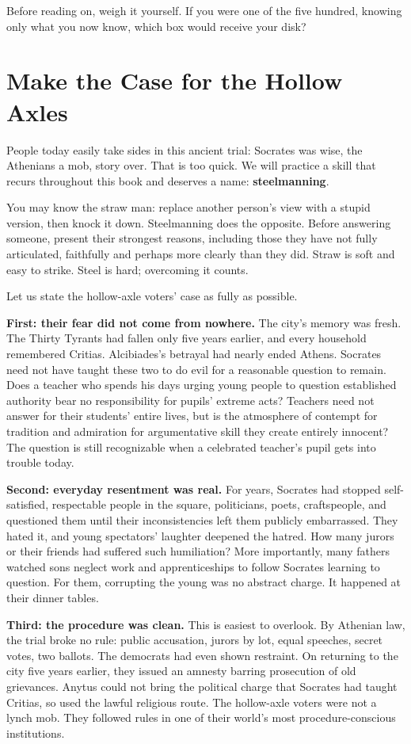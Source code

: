 Before reading on, weigh it yourself. If you were one of the five hundred, knowing only what you now know, which box would receive your disk?

\section{Make the Case for the Hollow Axles}
People today easily take sides in this ancient trial: Socrates was wise, the Athenians a mob, story over. That is too quick. We will practice a skill that recurs throughout this book and deserves a name: \textbf{steelmanning}.

You may know the straw man: replace another person's view with a stupid version, then knock it down. Steelmanning does the opposite. Before answering someone, present their strongest reasons, including those they have not fully articulated, faithfully and perhaps more clearly than they did. Straw is soft and easy to strike. Steel is hard; overcoming it counts.

Let us state the hollow-axle voters' case as fully as possible.

\textbf{First: their fear did not come from nowhere.} The city's memory was fresh. The Thirty Tyrants had fallen only five years earlier, and every household remembered Critias. Alcibiades's betrayal had nearly ended Athens. Socrates need not have taught these two to do evil for a reasonable question to remain. Does a teacher who spends his days urging young people to question established authority bear no responsibility for pupils' extreme acts? Teachers need not answer for their students' entire lives, but is the atmosphere of contempt for tradition and admiration for argumentative skill they create entirely innocent? The question is still recognizable when a celebrated teacher's pupil gets into trouble today.

\textbf{Second: everyday resentment was real.} For years, Socrates had stopped self-satisfied, respectable people in the square, politicians, poets, craftspeople, and questioned them until their inconsistencies left them publicly embarrassed. They hated it, and young spectators' laughter deepened the hatred. How many jurors or their friends had suffered such humiliation? More importantly, many fathers watched sons neglect work and apprenticeships to follow Socrates learning to question. For them, corrupting the young was no abstract charge. It happened at their dinner tables.

\textbf{Third: the procedure was clean.} This is easiest to overlook. By Athenian law, the trial broke no rule: public accusation, jurors by lot, equal speeches, secret votes, two ballots. The democrats had even shown restraint. On returning to the city five years earlier, they issued an amnesty barring prosecution of old grievances. Anytus could not bring the political charge that Socrates had taught Critias, so used the lawful religious route. The hollow-axle voters were not a lynch mob. They followed rules in one of their world's most procedure-conscious institutions.

